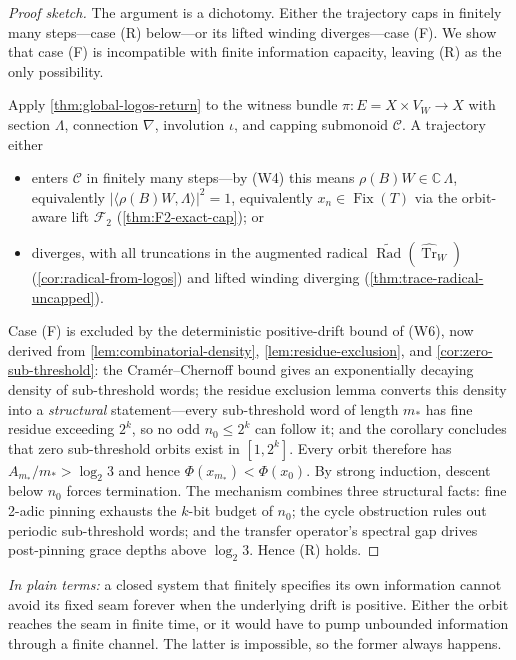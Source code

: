 \documentclass[11pt,a4paper]{article}
\theoremstyle{plain}
\theoremstyle{definition}
\theoremstyle{remark}
\numberwithin{equation}{section}
\newcommand{\Complex}{\mathbb{C}}
\DeclareMathOperator{\Tr}{Tr}
\DeclareMathOperator{\Fix}{Fix}
\DeclareMathOperator{\Rad}{Rad}
\begin{document}
\begin{proof}[Proof sketch]
The argument is a dichotomy.  Either the trajectory caps in
finitely many steps---case (R) below---or its lifted winding
diverges---case (F).  We show that case (F) is incompatible with
finite information capacity, leaving (R) as the only possibility.

Apply \cref{thm:global-logos-return} to the witness bundle
\(\pi:E=X\times V_W\to X\) with section \(\Lambda\), connection
\(\nabla\), involution \(\iota\), and capping submonoid
\(\mathcal{C}\).  A trajectory either
\begin{itemize}
\item[(R)] enters \(\mathcal{C}\) in finitely many steps---by (W4)
this means \(\rho(B)W\in\Complex\,\Lambda\), equivalently
\(|\langle\rho(B)W,\Lambda\rangle|^2=1\), equivalently
\(x_n\in\Fix(T)\) via the orbit-aware lift \(\mathcal{F}_2\)
(\cref{thm:F2-exact-cap}); or
\item[(F)] diverges, with all truncations in the augmented radical
\(\widetilde{\Rad}(\widehat{\Tr}_W)\)
(\cref{cor:radical-from-logos}) and lifted winding diverging
(\cref{thm:trace-radical-uncapped}).
\end{itemize}

Case (F) is excluded by the deterministic positive-drift bound
of (W6), now derived from \cref{lem:combinatorial-density},
\cref{lem:residue-exclusion}, and \cref{cor:zero-sub-threshold}:
the Cram\'er--Chernoff bound gives an exponentially decaying
density of sub-threshold words; the residue exclusion lemma
converts this density into a \emph{structural} statement---every
sub-threshold word of length $m_*$ has fine residue exceeding
$2^k$, so no odd $n_0\le 2^k$ can follow it; and the corollary
concludes that zero sub-threshold orbits exist in $[1,2^k]$.
Every orbit therefore has $A_{m_*}/m_*>\log_2 3$ and hence
$\Phi(x_{m_*})<\Phi(x_0)$.  By strong induction, descent below
$n_0$ forces termination.  The mechanism combines three structural
facts: fine 2-adic pinning exhausts the $k$-bit budget
of $n_0$; the cycle obstruction rules out periodic sub-threshold
words; and the transfer operator's spectral gap drives
post-pinning grace depths above $\log_2 3$.  Hence (R)
holds.
\end{proof}

\noindent\emph{In plain terms:} a closed system that finitely
specifies its own information cannot avoid its fixed seam forever
when the underlying drift is positive.  Either the orbit reaches
the seam in finite time, or it would have to pump unbounded
information through a finite channel.  The latter is impossible,
so the former always happens.
\end{document}
